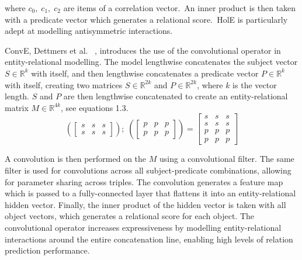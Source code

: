 \noindent where $ c_0, \; c_1, \; c_2 $ are items of a correlation vector.\ An inner product is then taken with a predicate vector which generates a relational score.\ HolE is particularly adept at modelling antisymmetric interactions. \par

\noindent ConvE, Dettmers et al.  \unskip~\citep{dettmers2018convolutional}, introduces the use of the convolutional operator in entity-relational modelling. The model lengthwise concatenates the subject vector $ S \in \mathbb{R}^{k} $ with itself, and then lengthwise concatenates a predicate vector $ P \in \mathbb{R}^{k} $ with itself, creating two matrices $ S \in \mathbb{R}^{2k} $ and $ P \in \mathbb{R}^{2k} $, where $ k $  is the vector length. $ S $ and $ P $ are then lengthwise concatenated to create an entity-relational matrix $ M \in \mathbb{R}^{4k} $, see equations 1.3.
\begin{equation}
	(\begin{bmatrix}
        		s & s & s \\
           	s & s & s 
       	\end{bmatrix}); \; (\begin{bmatrix}
        					p & p & p \\
           				p & p & p 
       				\end{bmatrix}) = \begin{bmatrix}
        								s & s & s \\
           							s & s & s \\
           							p & p & p \\
           							p & p & p
        			     				\end{bmatrix}
\end{equation}

\noindent A convolution is then performed on the $ M $ using a convolutional filter. The same filter is used for convolutions across all subject-predicate combinations, allowing for parameter sharing across triples. The convolution generates a feature map which is passed to a fully-connected layer that flattens it into an entity-relational hidden vector. Finally, the inner product of the hidden vector is taken with all object vectors, which generates a relational score for each object. The convolutional operator increases expressiveness by modelling entity-relational interactions around the entire concatenation line, enabling high levels of relation prediction performance. \par

